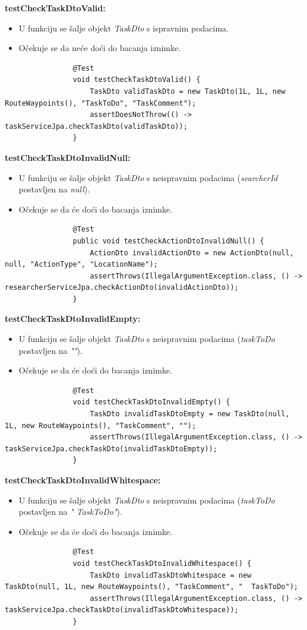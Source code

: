 			\textbf{testCheckTaskDtoValid:}
			\begin{itemize}
				\item U funkciju se šalje objekt \textit{TaskDto} s ispravnim podacima.
				\item Očekuje se da neće doći do bacanja iznimke.
			\end{itemize}
			\begin{lstlisting}
				@Test
				void testCheckTaskDtoValid() {
					TaskDto validTaskDto = new TaskDto(1L, 1L, new RouteWaypoints(), "TaskToDo", "TaskComment");
					assertDoesNotThrow(() -> taskServiceJpa.checkTaskDto(validTaskDto));
				}
			\end{lstlisting}
			
			\textbf{testCheckTaskDtoInvalidNull:}
			\begin{itemize}
				\item U funkciju se šalje objekt \textit{TaskDto} s neispravnim podacima (\textit{searcherId} postavljen na \textit{null}).
				\item Očekuje se da će doći do bacanja iznimke.
			\end{itemize}
			\begin{lstlisting}
				@Test
				public void testCheckActionDtoInvalidNull() {
					ActionDto invalidActionDto = new ActionDto(null, null, "ActionType", "LocationName");
					assertThrows(IllegalArgumentException.class, () -> researcherServiceJpa.checkActionDto(invalidActionDto));
				}
			\end{lstlisting}
			
			\textbf{testCheckTaskDtoInvalidEmpty:}
			\begin{itemize}
				\item U funkciju se šalje objekt \textit{TaskDto} s neispravnim podacima (\textit{taskToDo} postavljen na \textit{""}).
				\item Očekuje se da će doći do bacanja iznimke.
			\end{itemize}
			\begin{lstlisting}
				@Test
				void testCheckTaskDtoInvalidEmpty() {
					TaskDto invalidTaskDtoEmpty = new TaskDto(null, 1L, new RouteWaypoints(), "TaskComment", "");
					assertThrows(IllegalArgumentException.class, () -> taskServiceJpa.checkTaskDto(invalidTaskDtoEmpty));
				}
			\end{lstlisting}
			
			\textbf{testCheckTaskDtoInvalidWhitespace:}
			\begin{itemize}
				\item U funkciju se šalje objekt \textit{TaskDto} s neispravnim podacima (\textit{taskToDo} postavljen na \textit{"  TaskToDo"}).
				\item Očekuje se da će doći do bacanja iznimke.
			\end{itemize}
			\begin{lstlisting}
				@Test
				void testCheckTaskDtoInvalidWhitespace() {
					TaskDto invalidTaskDtoWhitespace = new TaskDto(null, 1L, new RouteWaypoints(), "TaskComment", "  TaskToDo");
					assertThrows(IllegalArgumentException.class, () -> taskServiceJpa.checkTaskDto(invalidTaskDtoWhitespace));
				}
			\end{lstlisting}
			
